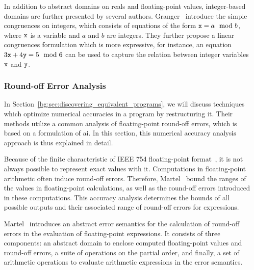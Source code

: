 In addition to abstract domains on reals and floating-point values,
integer-based domains are further presented by several authors.
Granger~\cite{granger89} introduce the simple congruences on integers,
which consists of equations of the form $\texttt{x} = a \mod b$, where $\texttt{x}$
is a variable and $a$ and $b$ are integers.  They further propose a linear
congruences formulation which is more expressive, for instance, an equation $3
\texttt{x} + 4 \texttt{y} = 5 \mod 6$ can be used to capture the relation between integer
variables $\texttt{x}$ and $\texttt{y}$.

\subsubsection{Round-off Error Analysis}
\label{bg:ssub:accuracy}


In Section~\ref{bg:sec:discovering_equivalent_programs}, we will discuss
techniques which optimize numerical accuracies in a program by restructuring
it.  Their methods utilize a common analysis of floating-point round-off
errors, which is based on a formulation of \gls{ai}\@.  In this section, this
numerical accuracy analysis approach is thus explained in detail.

Because of the finite characteristic of IEEE 754 floating-point
format~\cite{ieee754}, it is not always possible to represent exact values
with it.  Computations in floating-point arithmetic often induce round-off
errors.  Therefore, Martel~\cite{martel07} bound the ranges of the values
in floating-point calculations, as well as the round-off errors introduced
in these computations.  This accuracy analysis determines the bounds of
all possible outputs and their associated range of round-off errors for
expressions.

Martel~\cite{martel07} introduces an abstract error semantics for the
calculation of round-off errors in the evaluation of floating-point
expressions.  It consists of three components: an abstract domain to enclose
computed floating-point values and round-off errors, a suite of operations on
the partial order, and finally, a set of arithmetic operations to evaluate
arithmetic expressions in the error semantics.

